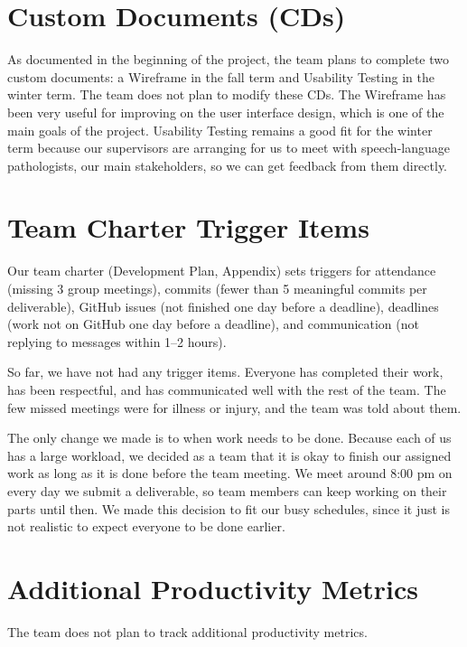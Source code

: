 \documentclass{article}
\begin{document}
\section{Custom Documents (CDs)}

As documented in the beginning of the project, the team plans to complete two custom
documents: a Wireframe in the fall term and Usability Testing in the winter term.
The team does not plan to modify these CDs. The Wireframe has been very useful
for improving on the user interface design, which is one of the main goals of the
project. Usability Testing remains a good fit for the winter term because our
supervisors are arranging for us to meet with speech-language pathologists, our main stakeholders, so we can get feedback from them directly.

\section{Team Charter Trigger Items}

Our team charter (Development Plan, Appendix) sets triggers for attendance
(missing 3 group meetings), commits (fewer than 5 meaningful commits per
deliverable), GitHub issues (not finished one day before a deadline), deadlines
(work not on GitHub one day before a deadline), and communication (not replying
to messages within 1--2 hours).

So far, we have not had any trigger items. Everyone has completed their work, has
been respectful, and has communicated well with the rest of the team. The few
missed meetings were for illness or injury, and the team was told about them.

The only change we made is to when work needs to be done. Because each of us has
a large workload, we decided as a team that it is okay to finish our assigned
work as long as it is done before the team meeting. We meet around 8:00 pm on
every day we submit a deliverable, so team members can keep working on their parts
until then. We made this decision to fit our busy schedules, since it just is not
realistic to expect everyone to be done earlier.

\section{Additional Productivity Metrics}
The team does not plan to track additional productivity metrics.
\end{document}
